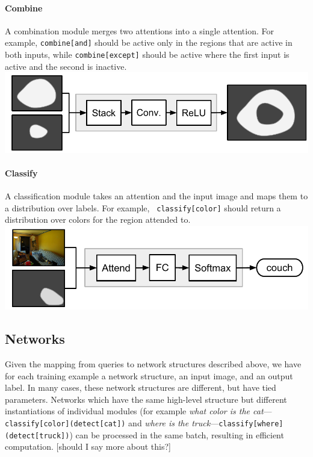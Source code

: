 \documentclass[10pt,twocolumn,letterpaper]{article}
\begin{document}
\paragraph{Combine}

A combination module  merges two attentions into a single
attention. For example, {\small\tt combine[and]} should be active only in the
regions that are active in both inputs, while {\small\tt{combine[except]}}
should be active where the first input is active and the second is
inactive.\\[1em] \includegraphics[width=\columnwidth]{fig/combine}

\paragraph{Classify}

A classification module  takes an attention and the input
image and maps them to a distribution over labels. For example, {\small\tt
classify[color]} should return a distribution over colors for the region
attended to.\\[1em] \includegraphics[width=\columnwidth]{fig/classify}

\subsection{Networks}

Given the mapping from queries to network structures described above, we have
for each training example a network structure, an input image, and an output
label. In many cases, these network structures are different, but have tied
parameters. Networks which have the same high-level structure but different
instantiations of individual modules (for example \emph{what color is the
cat}---{\small\tt classify[color](detect[cat])} and \emph{where is the
truck}---{\small\tt classify[where](detect[truck])}) can be processed in the
same batch, resulting in efficient computation. [should I say more about this?]
\end{document}
